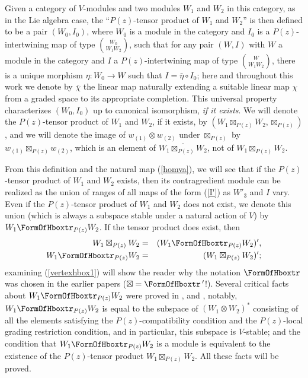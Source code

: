 \documentclass[12pt]{article}
\begin{document}
Given a category of $V$-modules and two modules $W_1$ and $W_2$ in
this category, as in the Lie algebra case, the ``$P(z)$-tensor product
of $W_1$ and $W_2$'' is then defined to be a pair $(W_0,I_0)$, where
$W_0$ is a module in the category and $I_0$ is a $P(z)$-intertwining
map of type ${W_0 \choose {W_1 W_2}}$, such that for any pair $(W,I)$
with $W$ a module in the category and $I$ a $P(z)$-intertwining map of
type ${W \choose {W_1 W_2}}$, there is a unique morphism $\eta:
W_0\longrightarrow W$ such that $I=\bar\eta \circ I_0$; here and
throughout this work we denote by $\bar\chi$ the linear map naturally
extending a suitable linear map $\chi$ {}from a graded space to its
appropriate completion. This universal property characterizes $(W_0,
I_0)$ up to canonical isomorphism, {\it if it exists}.  We will denote
the $P(z)$-tensor product of $W_1$ and $W_2$, if it exists, by
$(W_1\boxtimes_{P(z)} W_2, \boxtimes_{P(z)})$, and we will denote the
image of $w_{(1)}\otimes w_{(2)}$ under $\boxtimes_{P(z)}$ by
$w_{(1)}\boxtimes_{P(z)} w_{(2)}$, which is an element of
$\overline{W_1\boxtimes_{P(z)} W_2}$, not of $W_1\boxtimes_{P(z)}
W_2$.

{}From this definition and the natural map (\ref{homva}), we will see
that if the $P(z)$-tensor product of $W_1$ and $W_2$ exists, then its
contragredient module can be realized as the union of ranges of all
maps of the form (\ref{I'}) as $W'_3$ and $I$ vary.  Even if the
$P(z)$-tensor product of $W_1$ and $W_2$ does not exist, we denote
this union (which is always a subspace stable under a natural action
of $V$) by $W_1\hboxtr_{P(z)} W_2$.  If the tensor product does exist,
then
\begin{eqnarray}
W_1 \boxtimes_{P(z)} W_2 &=& (W_1 \hboxtr_{P(z)}
W_2)',\label{vertexhbox1}\\
W_1 \hboxtr_{P(z)} W_2 &=& (W_1 \boxtimes_{P(z)}
W_2)';\label{vertexhbox2}
\end{eqnarray}
examining (\ref{vertexhbox1}) will show the reader why the notation
$\hboxtr$ was chosen in the earlier papers ($\boxtimes = \hboxtr
\,'$!).  Several critical facts about $W_1\hboxtr_{P(z)} W_2$ were
proved in \cite{tensor1}, \cite{tensor2} and \cite{tensor3}, notably,
$W_1\hboxtr_{P(z)} W_2$ is equal to the subspace of $(W_1\otimes
W_2)^*$ consisting of all the elements satisfying the
$P(z)$-compatibility condition and the $P(z)$-local grading
restriction condition, and in particular, this subspace is $V$-stable;
and the condition that $W_1\hboxtr_{P(z)} W_2$ is a module is
equivalent to the existence of the $P(z)$-tensor product
$W_1\boxtimes_{P(z)} W_2$.  All these facts will be proved.
\end{document}
